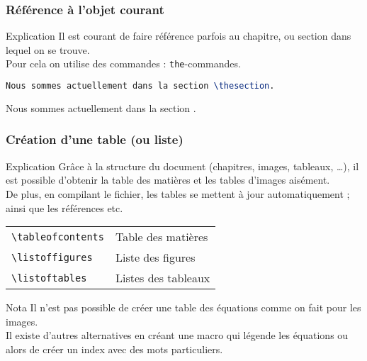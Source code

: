 \begin{frame}[containsverbatim]
    \frametitle{Référence à l'objet courant}
    \begin{alertblock}{Explication}
        Il est courant de faire référence parfois au chapitre, ou section dans lequel on se trouve. \\
        Pour cela on utilise des commandes : \texttt{the}-commandes.
    \end{alertblock}
    \begin{lstlisting}[language=TeX, caption=Exemple]
    Nous sommes actuellement dans la section \thesection.
    \end{lstlisting}
    Nous sommes actuellement dans la section \thesection.
\end{frame}

\begin{frame}[containsverbatim]
    \frametitle{Création d'une table (ou liste)}
    \begin{alertblock}{Explication}
        Grâce à la structure du document (chapitres, images, tableaux, \dots), il est possible d'obtenir la table des matières et les tables d'images aisément. \\
        De plus, en compilant le fichier, les tables se mettent à jour automatiquement ; ainsi que les références etc.
    \end{alertblock}
    \footnotesize
    \begin{table}
        \centering
        \begin{tabular}{|l|l|}
            \hline
            \verb|\tableofcontents| & Table des matières  \\
            \verb|\listoffigures|   & Liste des figures   \\
            \verb|\listoftables|    & Listes des tableaux \\
            \hline
        \end{tabular}
    \end{table}
    \begin{exampleblock}{Nota}
        Il n'est pas possible de créer une table des équations comme on fait pour les images. \\
        Il existe d'autres alternatives en créant une macro qui légende les équations ou alors de créer un index avec des mots particuliers.
    \end{exampleblock}
\end{frame}
\normalsize
